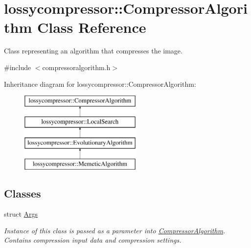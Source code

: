 \hypertarget{classlossycompressor_1_1_compressor_algorithm}{}\section{lossycompressor\+:\+:Compressor\+Algorithm Class Reference}
\label{classlossycompressor_1_1_compressor_algorithm}


Class representing an algorithm that compresses the image.  




{\ttfamily \#include $<$compressoralgorithm.\+h$>$}

Inheritance diagram for lossycompressor\+:\+:Compressor\+Algorithm\+:\begin{figure}[H]
\begin{center}
\leavevmode
\includegraphics[height=4.000000cm]{classlossycompressor_1_1_compressor_algorithm}
\end{center}
\end{figure}
\subsection*{Classes}
\begin{DoxyCompactItemize}
\item 
struct \hyperlink{structlossycompressor_1_1_compressor_algorithm_1_1_args}{Args}
\begin{DoxyCompactList}\small\item\em Instance of this class is passed as a parameter into \hyperlink{classlossycompressor_1_1_compressor_algorithm}{Compressor\+Algorithm}. Contains compression input data and compression settings. \end{DoxyCompactList}\end{DoxyCompactItemize}
